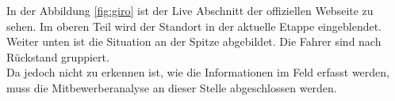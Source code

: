 In der Abbildung \ref{fig:giro} ist der Live Abschnitt der offiziellen Webseite zu sehen. Im oberen Teil wird der Standort in der aktuelle Etappe eingeblendet. Weiter unten ist die Situation an der Spitze abgebildet. Die Fahrer sind nach Rückstand gruppiert.
\\
Da jedoch nicht zu erkennen ist, wie die Informationen im Feld erfasst werden, muss die Mitbewerberanalyse an dieser Stelle abgeschlossen werden.